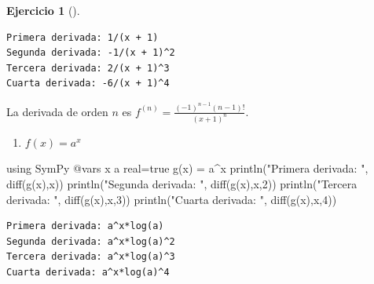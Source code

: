 \documentclass[
  a4paper,
]{scrreport}
\newenvironment{Shaded}{\begin{snugshade}}{\end{snugshade}}
\newcommand{\BuiltInTok}[1]{\textcolor[rgb]{0.00,0.23,0.31}{#1}}
\newcommand{\ConstantTok}[1]{\textcolor[rgb]{0.56,0.35,0.01}{#1}}
\newcommand{\FloatTok}[1]{\textcolor[rgb]{0.68,0.00,0.00}{#1}}
\newcommand{\FunctionTok}[1]{\textcolor[rgb]{0.28,0.35,0.67}{#1}}
\newcommand{\ImportTok}[1]{\textcolor[rgb]{0.00,0.46,0.62}{#1}}
\newcommand{\NormalTok}[1]{\textcolor[rgb]{0.00,0.23,0.31}{#1}}
\newcommand{\OperatorTok}[1]{\textcolor[rgb]{0.37,0.37,0.37}{#1}}
\newcommand{\PreprocessorTok}[1]{\textcolor[rgb]{0.68,0.00,0.00}{#1}}
\newcommand{\StringTok}[1]{\textcolor[rgb]{0.13,0.47,0.30}{#1}}
\providecommand{\tightlist}{%
  \setlength{\itemsep}{0pt}\setlength{\parskip}{0pt}}\usepackage{longtable,booktabs,array}
\theoremstyle{definition}
\newtheorem{exercise}{Ejercicio}[chapter]
\theoremstyle{remark}
\begin{document}
\begin{exercise}[]
\begin{tcolorbox}
\begin{verbatim}
Primera derivada: 1/(x + 1)
Segunda derivada: -1/(x + 1)^2
Tercera derivada: 2/(x + 1)^3
Cuarta derivada: -6/(x + 1)^4
\end{verbatim}

La derivada de orden \(n\) es
\(f^{(n)}=\frac{(-1)^{n-1}(n-1)!}{(x+1)^n}\).

\end{tcolorbox}

\begin{enumerate}
\def\labelenumi{\alph{enumi}.}
\setcounter{enumi}{1}
\tightlist
\item
  \(f(x)=a^x\)
\end{enumerate}

\begin{tcolorbox}[enhanced jigsaw, toprule=.15mm, arc=.35mm, bottomrule=.15mm, titlerule=0mm, bottomtitle=1mm, opacitybacktitle=0.6, colbacktitle=quarto-callout-tip-color!10!white, colframe=quarto-callout-tip-color-frame, opacityback=0, title=\textcolor{quarto-callout-tip-color}{\faLightbulb}\hspace{0.5em}{Solución}, breakable, colback=white, toptitle=1mm, leftrule=.75mm, coltitle=black, rightrule=.15mm, left=2mm]

\begin{Shaded}
\begin{Highlighting}[]
\ImportTok{using} \BuiltInTok{SymPy}
\PreprocessorTok{@vars}\NormalTok{ x a real}\OperatorTok{=}\ConstantTok{true}
\FunctionTok{g}\NormalTok{(x) }\OperatorTok{=}\NormalTok{ a}\OperatorTok{\^{}}\NormalTok{x}
\FunctionTok{println}\NormalTok{(}\StringTok{"Primera derivada: "}\NormalTok{, }\FunctionTok{diff}\NormalTok{(}\FunctionTok{g}\NormalTok{(x),x))}
\FunctionTok{println}\NormalTok{(}\StringTok{"Segunda derivada: "}\NormalTok{, }\FunctionTok{diff}\NormalTok{(}\FunctionTok{g}\NormalTok{(x),x,}\FloatTok{2}\NormalTok{))}
\FunctionTok{println}\NormalTok{(}\StringTok{"Tercera derivada: "}\NormalTok{, }\FunctionTok{diff}\NormalTok{(}\FunctionTok{g}\NormalTok{(x),x,}\FloatTok{3}\NormalTok{))}
\FunctionTok{println}\NormalTok{(}\StringTok{"Cuarta derivada: "}\NormalTok{, }\FunctionTok{diff}\NormalTok{(}\FunctionTok{g}\NormalTok{(x),x,}\FloatTok{4}\NormalTok{))}
\end{Highlighting}
\end{Shaded}

\begin{verbatim}
Primera derivada: a^x*log(a)
Segunda derivada: a^x*log(a)^2
Tercera derivada: a^x*log(a)^3
Cuarta derivada: a^x*log(a)^4
\end{verbatim}


\end{tcolorbox}
\end{exercise}
\end{document}
